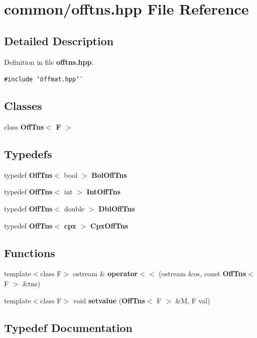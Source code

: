\section{common/offtns.hpp File Reference}
\label{offtns_8hpp}


\subsection{Detailed Description}


Definition in file {\bf offtns.hpp}.

{\tt \#include \char`\"{}offmat.hpp\char`\"{}}\par
\subsection*{Classes}
\begin{CompactItemize}
\item 
class {\bf Off\-Tns$<$ F $>$}
\end{CompactItemize}
\subsection*{Typedefs}
\begin{CompactItemize}
\item 
typedef {\bf Off\-Tns}$<$ bool $>$ {\bf Bol\-Off\-Tns}
\item 
typedef {\bf Off\-Tns}$<$ int $>$ {\bf Int\-Off\-Tns}
\item 
typedef {\bf Off\-Tns}$<$ double $>$ {\bf Dbl\-Off\-Tns}
\item 
typedef {\bf Off\-Tns}$<$ {\bf cpx} $>$ {\bf Cpx\-Off\-Tns}
\end{CompactItemize}
\subsection*{Functions}
\begin{CompactItemize}
\item 
template$<$class F$>$ ostream \& {\bf operator$<$$<$} (ostream \&os, const {\bf Off\-Tns}$<$ F $>$ \&tns)
\item 
template$<$class F$>$ void {\bf setvalue} ({\bf Off\-Tns}$<$ F $>$ \&M, F val)
\end{CompactItemize}


\subsection{Typedef Documentation}
